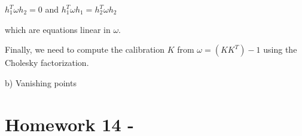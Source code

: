 \documentclass[]{article}
\begin{document}
\centerline {
	$h_1^T \omega h_2 = 0$ and $h_1^T \omega h_1 = h_2^T \omega h_2$
}


which are equations linear in $\omega$. 

Finally, we need to compute the calibration $K$ from $\omega = (KK^T)-1$ using the Cholesky factorization. 

\vspace{0.4em}

b) Vanishing points  




\section{Homework 14 - }
 
\end{document}
